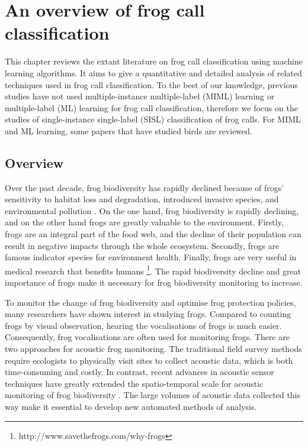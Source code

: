 
\chapter[Literature review]{An overview of frog call classification}
\label{cha:cha2LiteratureReview}

This chapter reviews the extant literature on frog call classification using machine learning algorithms. 
It aims to give a quantitative and detailed analysis of related techniques used in frog call classification. To the best of our knowledge, previous studies have not used multiple-instance multiple-label (MIML) learning or multiple-label (ML) learning for frog call classification, therefore we focus on the studies of single-instance single-label (SISL) classification of frog calls. For MIML and ML learning, some papers that have studied birds are reviewed.

\section{Overview}
\label{intro}
Over the past decade, frog biodiversity has rapidly declined because of frogs' sensitivity to habitat loss and degradation, introduced invasive species, and environmental pollution \citep{dudgeon2006freshwater}. On the one hand, frog biodiversity is rapidly declining, and on the other hand frogs are greatly valuable to the environment. Firstly, frogs are an integral part of the food web, and the decline of their population can result in negative impacts through the whole ecosystem. Secondly, frogs are famous indicator species for environment health. Finally, frogs are very useful in medical research that benefits humans \footnote{http://www.savethefrogs.com/why-frogs}. The rapid biodiversity decline and great importance of frogs make it necessary for frog biodiversity monitoring to increase. 

To monitor the change of frog biodiversity and optimise frog protection policies, many researchers have shown interest in studying frogs. Compared to counting frogs by visual observation, hearing the vocalisations of frogs is much easier. Consequently, frog vocalisations are often used for monitoring frogs. There are two approaches for acoustic frog monitoring. The traditional field survey methods require ecologists to physically visit sites to collect acoustic data, which is both time-consuming and costly. In contrast, recent advances in acoustic sensor techniques have greatly extended the spatio-temporal scale for acoustic monitoring of frog biodiversity \citep{wimmer2013analysing}. The large volumes of acoustic data collected this way make it essential to develop new automated methods of analysis. 



